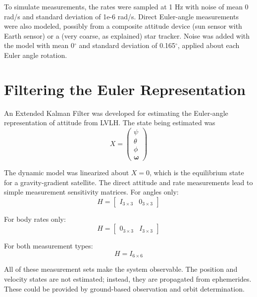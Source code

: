 \documentclass[]{aiaa-tc}%
\begin{document}
	\vspace{5 mm}

To simulate measurements, the rates were sampled at 1 Hz with noise of mean 0 rad/s and standard deviation of 1e-6 rad/s. Direct Euler-angle measurements were also modeled, possibly from a composite attitude device (sun sensor with Earth sensor) or a (very coarse, as explained) star tracker. Noise was added with the model with mean 0$^\circ$ and standard deviation of 0.165$^\circ$, applied about each Euler angle rotation.

	\section{Filtering the Euler Representation}

An Extended Kalman Filter was developed for estimating the Euler-angle representation of attitude from LVLH. The state being estimated was
\begin{equation}
X=\begin{pmatrix}
\psi\\ 
\theta\\ 
\phi\\ 
\boldsymbol{\omega}
\end{pmatrix}
\label{eqn:stateEuler}
\end{equation}

The dynamic model was linearized about $X=0$, which is the equilibrium state for a gravity-gradient satellite. The direct attitude and rate measurements lead to simple measurement sensitivity matrices. For angles only:
\begin{equation}
H=\begin{bmatrix}
I_{3\times 3} & 0_{3\times 3}
\end{bmatrix}
\label{eqn:H_Euler}
\end{equation}

\noindent For body rates only:
\begin{equation}
H=\begin{bmatrix}
0_{3\times 3} & I_{3\times 3}
\end{bmatrix}
\end{equation}

\noindent For both measurement types:
\begin{equation}
H=
I_{6\times 6}
\label{eqn:H_Euler}
\end{equation}

\noindent All of these measurement sets make the system observable.  The position and velocity states are not estimated; instead, they are propagated from ephemerides. These could be provided by ground-based observation and orbit determination.
\end{document}
